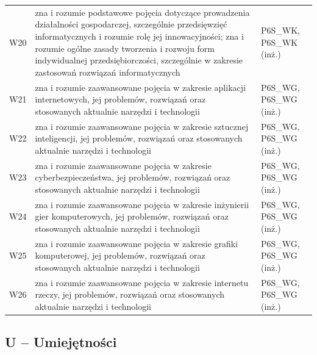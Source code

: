 \documentclass[12pt,a4paper]{article}
\begin{document}
{\begin{longtable}{m{1cm}m{9.5cm}m{3.9cm}}
\rowcolor{tableRowAlt} W20 & zna i rozumie podstawowe pojęcia dotyczące prowadzenia działalności gospodarczej, szczególnie przedsięwzięć informatycznych i rozumie rolę jej innowacyjności; zna i rozumie ogólne zasady tworzenia i rozwoju form indywidualnej przedsiębiorczości, szczególnie w zakresie zastosowań rozwiązań informatycznych & {\scriptsize P6S\_WK, P6S\_WK {\scriptsize (inż.)}} \\
\rowcolor{tableRowLight} W21 & zna i rozumie zaawansowane pojęcia w zakresie aplikacji internetowych, jej problemów, rozwiązań oraz stosowanych aktualnie narzędzi i technologii & {\scriptsize P6S\_WG, P6S\_WG {\scriptsize (inż.)}} \\
\rowcolor{tableRowAlt} W22 & zna i rozumie zaawansowane pojęcia w zakresie sztucznej inteligencji, jej problemów, rozwiązań oraz stosowanych aktualnie narzędzi i technologii & {\scriptsize P6S\_WG, P6S\_WG {\scriptsize (inż.)}} \\
\rowcolor{tableRowLight} W23 & zna i rozumie zaawansowane pojęcia w zakresie cyberbezpieczeństwa, jej problemów, rozwiązań oraz stosowanych aktualnie narzędzi i technologii & {\scriptsize P6S\_WG, P6S\_WG {\scriptsize (inż.)}} \\
\rowcolor{tableRowAlt} W24 & zna i rozumie zaawansowane pojęcia w zakresie inżynierii gier komputerowych, jej problemów, rozwiązań oraz stosowanych aktualnie narzędzi i technologii & {\scriptsize P6S\_WG, P6S\_WG {\scriptsize (inż.)}} \\
\rowcolor{tableRowLight} W25 & zna i rozumie zaawansowane pojęcia w zakresie grafiki komputerowej, jej problemów, rozwiązań oraz stosowanych aktualnie narzędzi i technologii & {\scriptsize P6S\_WG, P6S\_WG {\scriptsize (inż.)}} \\
\rowcolor{tableRowAlt} W26 & zna i rozumie zaawansowane pojęcia w zakresie internetu rzeczy, jej problemów, rozwiązań oraz stosowanych aktualnie narzędzi i technologii & {\scriptsize P6S\_WG, P6S\_WG {\scriptsize (inż.)}} \\
\bottomrule
\end{longtable}}

\subsection*{U -- Umiejętności}
\end{document}
